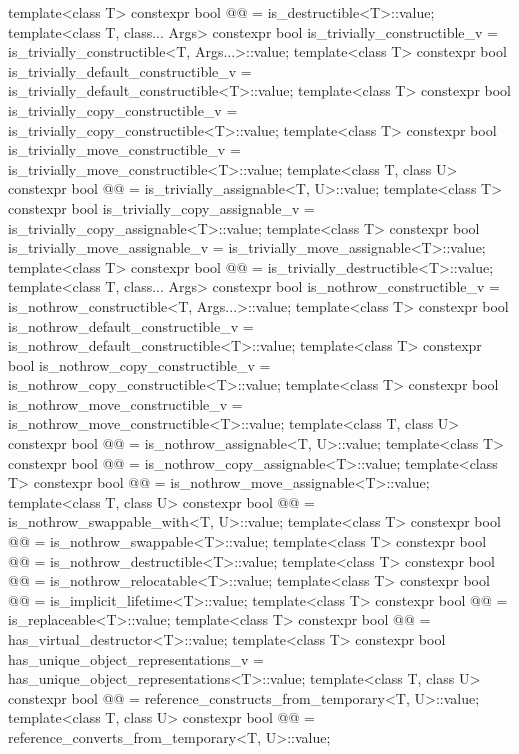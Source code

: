 \begin{codeblock}
{  template<class T>
    constexpr bool @@ = is_destructible<T>::value;
  template<class T, class... Args>
    constexpr bool is_trivially_constructible_v
      = is_trivially_constructible<T, Args...>::value;
  template<class T>
    constexpr bool is_trivially_default_constructible_v
      = is_trivially_default_constructible<T>::value;
  template<class T>
    constexpr bool is_trivially_copy_constructible_v
      = is_trivially_copy_constructible<T>::value;
  template<class T>
    constexpr bool is_trivially_move_constructible_v
      = is_trivially_move_constructible<T>::value;
  template<class T, class U>
    constexpr bool @@ = is_trivially_assignable<T, U>::value;
  template<class T>
    constexpr bool is_trivially_copy_assignable_v
      = is_trivially_copy_assignable<T>::value;
  template<class T>
    constexpr bool is_trivially_move_assignable_v
      = is_trivially_move_assignable<T>::value;
  template<class T>
    constexpr bool @@ = is_trivially_destructible<T>::value;
  template<class T, class... Args>
    constexpr bool is_nothrow_constructible_v
      = is_nothrow_constructible<T, Args...>::value;
  template<class T>
    constexpr bool is_nothrow_default_constructible_v
      = is_nothrow_default_constructible<T>::value;
  template<class T>
    constexpr bool is_nothrow_copy_constructible_v
      = is_nothrow_copy_constructible<T>::value;
  template<class T>
    constexpr bool is_nothrow_move_constructible_v
      = is_nothrow_move_constructible<T>::value;
  template<class T, class U>
    constexpr bool @@ = is_nothrow_assignable<T, U>::value;
  template<class T>
    constexpr bool @@ = is_nothrow_copy_assignable<T>::value;
  template<class T>
    constexpr bool @@ = is_nothrow_move_assignable<T>::value;
  template<class T, class U>
    constexpr bool @@ = is_nothrow_swappable_with<T, U>::value;
  template<class T>
    constexpr bool @@ = is_nothrow_swappable<T>::value;
  template<class T>
    constexpr bool @@ = is_nothrow_destructible<T>::value;
  template<class T>
    constexpr bool @@ = is_nothrow_relocatable<T>::value;
  template<class T>
    constexpr bool @@ = is_implicit_lifetime<T>::value;
  template<class T>
    constexpr bool @@ = is_replaceable<T>::value;
  template<class T>
    constexpr bool @@ = has_virtual_destructor<T>::value;
  template<class T>
    constexpr bool has_unique_object_representations_v
      = has_unique_object_representations<T>::value;
  template<class T, class U>
    constexpr bool @@
      = reference_constructs_from_temporary<T, U>::value;
  template<class T, class U>
    constexpr bool @@
      = reference_converts_from_temporary<T, U>::value;

}
\end{codeblock}
